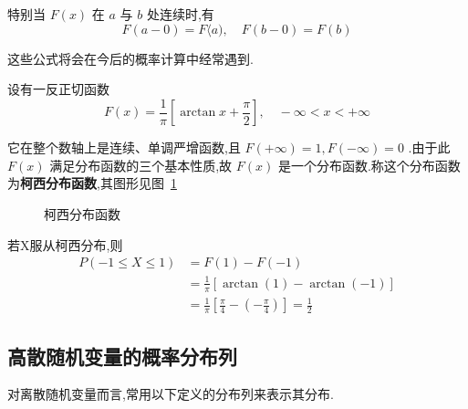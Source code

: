 特别当 $ F(x) $ 在 $ a $ 与 $ b $ 处连续时,有
\[ 
F(a-0)=F\langle a), \quad F(b-0)=F(b)
\]

这些公式将会在今后的概率计算中经常遇到.

\begin{example}\label{exam:2.1.2}
	设有一反正切函数
	\[ 
	F(x)=\frac{1}{\pi}\left[\arctan x+\frac{\pi}{2}\right], \quad-\infty<x<+\infty
	\]
	
	它在整个数轴上是连续、单调严增函数,且 $ F(+\infty)=1, F(-\infty)=0 $ .由于此 $ F(x) $ 满足分布函数的三个基本性质,故 $ F(x) $ 是一个分布函数.称这个分布函数为\textbf{柯西分布函数},其图形见图~\ref{fig:2.1.1}
	
\begin{figure}[!ht]
    \centering
    \caption{柯西分布函数}\label{fig:2.1.1}
\end{figure}
	
	若X服从柯西分布,则
	\[ 
	\begin{aligned} P(-1 \leqslant X \leqslant 1) &=F(1)-F(-1) \\ &=\frac{1}{\pi}[\arctan (1)-\arctan (-1)] \\ &=\frac{1}{\pi}\left[\frac{\pi}{4}-\left(-\frac{\pi}{4}\right)\right]=\frac{1}{2} \end{aligned}
	\]
	
\end{example}

\subsection{高散随机变量的概率分布列}

对离散随机变量而言,常用以下定义的分布列来表示其分布.

